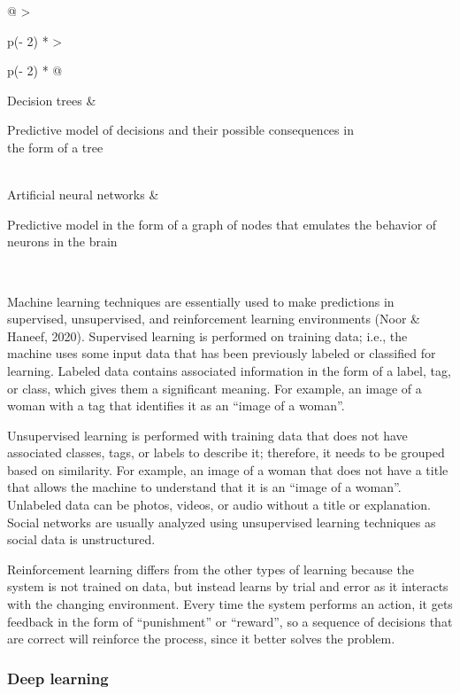 \documentclass[
  letterpaper,
  DIV=11,
  numbers=noendperiod]{scrreprt}
\begin{document}
\begin{longtable}[]{@{}
  >{\raggedright\arraybackslash}p{(\columnwidth - 2\tabcolsep) * }
  >{\raggedright\arraybackslash}p{(\columnwidth - 2\tabcolsep) * }@{}}
Decision trees & \begin{minipage}[t]{\linewidth}\raggedright
Predictive model of decisions and their possible consequences in\\
the form of a tree
\end{minipage} \\
Artificial neural networks & \begin{minipage}[t]{\linewidth}\raggedright
Predictive model in the form of a graph of nodes that emulates the
behavior of neurons in the brain
\end{minipage} \\
\end{longtable}

Machine learning techniques are essentially used to make predictions in
supervised, unsupervised, and reinforcement learning environments (Noor
\& Haneef, 2020). Supervised learning is performed on training data;
i.e., the machine uses some input data that has been previously labeled
or classified for learning. Labeled data contains associated information
in the form of a label, tag, or class, which gives them a significant
meaning. For example, an image of a woman with a tag that identifies it
as an ``image of a woman''.

Unsupervised learning is performed with training data that does not have
associated classes, tags, or labels to describe it; therefore, it needs
to be grouped based on similarity. For example, an image of a woman that
does not have a title that allows the machine to understand that it is
an ``image of a woman''. Unlabeled data can be photos, videos, or audio
without a title or explanation. Social networks are usually analyzed
using unsupervised learning techniques as social data is unstructured.

Reinforcement learning differs from the other types of learning because
the system is not trained on data, but instead learns by trial and error
as it interacts with the changing environment. Every time the system
performs an action, it gets feedback in the form of ``punishment'' or
``reward'', so a sequence of decisions that are correct will reinforce
the process, since it better solves the problem.

\hypertarget{deep-learning}{%
\subsubsection{Deep learning}\label{deep-learning}}
\end{document}

